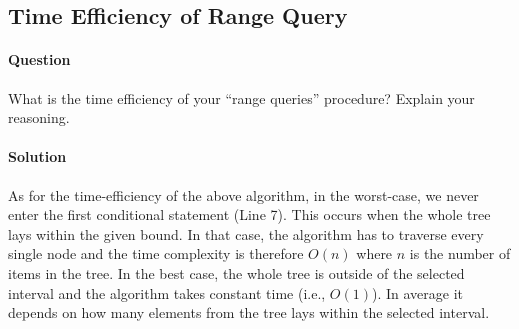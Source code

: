 \documentclass{article}
\begin{document}
\subsection{Time Efficiency of Range Query}

\paragraph{Question} What is the time efficiency of your ``range
queries'' procedure? Explain your reasoning.

\paragraph{Solution} As for the time-efficiency of the above
algorithm, in the worst-case, we never enter the first conditional
statement (Line 7). This occurs when the whole tree lays within the
given bound. In that case, the algorithm has to traverse every single
node and the time complexity is therefore $O(n)$ where $n$ is the
number of items in the tree. In the best case, the whole tree is
outside of the selected interval and the algorithm takes constant time
(i.e., $O(1)$). In average it depends on how many elements from the tree
lays within the selected interval.
\end{document}
